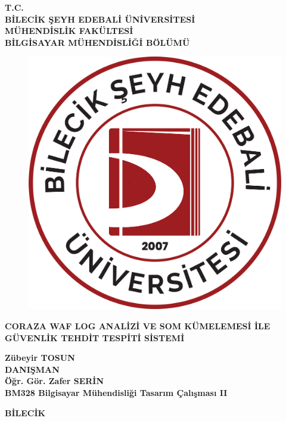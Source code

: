 \thispagestyle{empty}
    \begin{center}

    \textbf{T.C. \\BİLECİK ŞEYH EDEBALİ ÜNİVERSİTESİ \\ MÜHENDİSLİK FAKÜLTESİ \\ BİLGİSAYAR MÜHENDİSLİĞİ BÖLÜMÜ}
    \vspace{.75cm}
    
    \begin{figure}[h!]
    \centering
    \includegraphics[width=0.25\linewidth]{BSEU_LOGO.png}   
    \end{figure}
    
    \vspace{1.25cm}
    
    \textbf{CORAZA WAF LOG ANALİZİ VE SOM KÜMELEMESİ İLE GÜVENLİK TEHDİT TESPİTİ SİSTEMİ }

    \vspace{2cm}
    
    \textbf{Zübeyir TOSUN} \\
    
    \vfill
    \textbf{DANIŞMAN} \\    
    \textbf{Öğr. Gör. Zafer SERİN} \\
    
    \vspace{0.8cm}
    \textbf{BM328 Bilgisayar Mühendisliği Tasarım Çalışması II}
    \vspace{0.8cm}
    
    
    \textbf{BİLECİK \the\year}
    \end{center}
